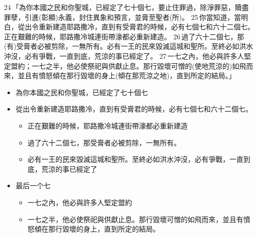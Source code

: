 24 「為你本國之民和你聖城，已經定了七十個七，要止住罪過，除淨罪惡，贖盡罪孽，引進(彰顯)永義，封住異象和預言，並膏至聖者(所)。 25 你當知道，當明白，從出令重新建造耶路撒冷，直到有受膏君的時候，必有七個七和六十二個七。正在艱難的時候，耶路撒冷城連街帶濠都必重新建造。 26 過了六十二個七，那(有)受膏者必被剪除，一無所有。必有一王的民來毀滅這城和聖所。至終必如洪水沖沒，必有爭戰，一直到底，荒涼的事已經定了。 27 一七之內，他必與許多人堅定盟約；一七之半，他必使祭祀與供獻止息。那行毀壞可憎的(使地荒涼的)如飛而來，並且有憤怒傾在那行毀壞的身上(傾在那荒涼之地)，直到所定的結局。」

\begin{itemize}
\itemsep-.45em  
\item 為你本國之民和你聖城，已經定了七十個七 
\item 從出令重新建造耶路撒冷，直到有受膏君的時候，必有七個七和六十二個七。
\begin{itemize}
\itemsep-.45em  
\item 正在艱難的時候，耶路撒冷城連街帶濠都必重新建造
\item 過了六十二個七，那受膏者必被剪除，一無所有。
\item 必有一王的民來毀滅這城和聖所。至終必如洪水沖沒，必有爭戰，一直到底，荒涼的事已經定了
\end{itemize}
\item 最后一个七
\begin{itemize}
\itemsep-.45em  
\item 一七之內，他必與許多人堅定盟約
\item 一七之半，他必使祭祀與供獻止息。那行毀壞可憎的如飛而來，並且有憤怒傾在那行毀壞的身上，直到所定的結局。
\end{itemize}
\end{itemize}



